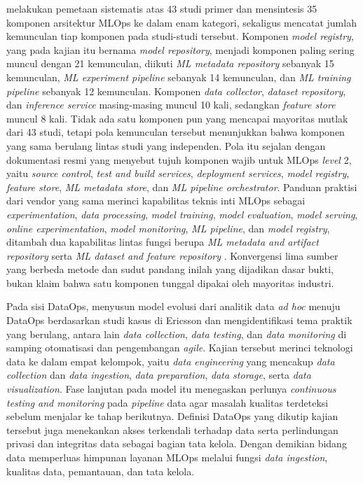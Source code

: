 \textcite{najafabadi2024analysis} melakukan pemetaan sistematis atas 43 studi primer dan mensintesis 35 komponen arsitektur MLOps ke dalam enam kategori, sekaligus mencatat jumlah kemunculan tiap komponen pada studi-studi tersebut. Komponen \textit{model registry}, yang pada kajian itu bernama \textit{model repository}, menjadi komponen paling sering muncul dengan 21 kemunculan, diikuti \textit{ML metadata repository} sebanyak 15 kemunculan, \textit{ML experiment pipeline} sebanyak 14 kemunculan, dan \textit{ML training pipeline} sebanyak 12 kemunculan. Komponen \textit{data collector}, \textit{dataset repository}, dan \textit{inference service} masing-masing muncul 10 kali, sedangkan \textit{feature store} muncul 8 kali. Tidak ada satu komponen pun yang mencapai mayoritas mutlak dari 43 studi, tetapi pola kemunculan tersebut menunjukkan bahwa komponen yang sama berulang lintas studi yang independen. Pola itu sejalan dengan dokumentasi resmi \textcite{googlecloud2024mlops} yang menyebut tujuh komponen wajib untuk MLOps \textit{level} 2, yaitu \textit{source control}, \textit{test and build services}, \textit{deployment services}, \textit{model registry}, \textit{feature store}, \textit{ML metadata store}, dan \textit{ML pipeline orchestrator}. Panduan praktisi dari vendor yang sama merinci kapabilitas teknis inti MLOps sebagai \textit{experimentation}, \textit{data processing}, \textit{model training}, \textit{model evaluation}, \textit{model serving}, \textit{online experimentation}, \textit{model monitoring}, \textit{ML pipeline}, dan \textit{model registry}, ditambah dua kapabilitas lintas fungsi berupa \textit{ML metadata and artifact repository} serta \textit{ML dataset and feature repository} \autocite{salama2021practitioners}. Konvergensi lima sumber yang berbeda metode dan sudut pandang inilah yang dijadikan dasar bukti, bukan klaim bahwa satu komponen tunggal dipakai oleh mayoritas industri.

Pada sisi DataOps, \textcite{munappy2020adhoc} menyusun model evolusi dari analitik data \textit{ad hoc} menuju DataOps berdasarkan studi kasus di Ericsson dan mengidentifikasi tema praktik yang berulang, antara lain \textit{data collection}, \textit{data testing}, dan \textit{data monitoring} di samping otomatisasi dan pengembangan \textit{agile}. Kajian tersebut merinci teknologi data ke dalam empat kelompok, yaitu \textit{data engineering} yang mencakup \textit{data collection} dan \textit{data ingestion}, \textit{data preparation}, \textit{data storage}, serta \textit{data visualization}. Fase lanjutan pada model itu menegaskan perlunya \textit{continuous testing and monitoring} pada \textit{pipeline} data agar masalah kualitas terdeteksi sebelum menjalar ke tahap berikutnya. Definisi DataOps yang dikutip kajian tersebut juga menekankan akses terkendali terhadap data serta perlindungan privasi dan integritas data sebagai bagian tata kelola. Dengan demikian bidang data memperluas himpunan layanan MLOps melalui fungsi \textit{data ingestion}, kualitas data, pemantauan, dan tata kelola.

